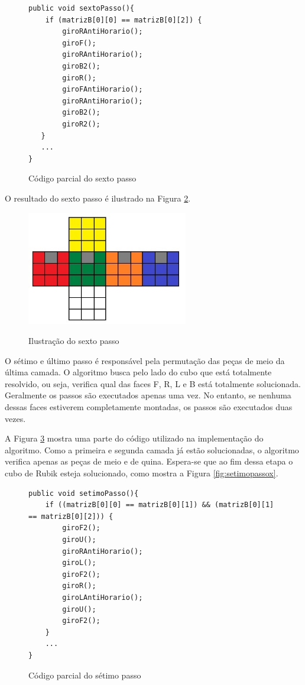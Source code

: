 \begin{figure}[!htb]
\begin{lstlisting}
public void sextoPasso(){
    if (matrizB[0][0] == matrizB[0][2]) {
        giroRAntiHorario();
        giroF();
        giroRAntiHorario();
        giroB2();
        giroR();
        giroFAntiHorario();
        giroRAntiHorario();
        giroB2();
        giroR2();
   }
   ...
}
\end{lstlisting}
\caption{Código parcial do sexto passo}
\label{fig:figfsfsdxx}
\end{figure}


O resultado do sexto passo é ilustrado na Figura \ref{fig:sextopasso}.

\begin{figure}[!htb]
    \centering
    {
        \includegraphics[height=5cm]{imagens/sextopasso.jpg}
        \label{figFront}
    }
    
\caption{Ilustração do sexto passo}
\label{fig:sextopasso}
\end{figure}


O sétimo e último passo é responsável pela permutação das peças de meio da última camada. O algoritmo busca pelo lado do cubo que está totalmente resolvido, ou seja, verifica qual das faces F, R, L e B está totalmente solucionada. Geralmente os passos são executados apenas uma vez. No entanto, se nenhuma dessas faces estiverem completamente montadas, os passos são executados duas vezes. 


A Figura \ref{fig:fiwwwwwww} mostra uma parte do código utilizado na implementação do algoritmo. Como a primeira e segunda camada já estão solucionadas, o algoritmo verifica apenas as peças de meio e de quina. Espera-se que ao fim dessa etapa o cubo de Rubik esteja solucionado, como mostra a Figura \ref{fig:setimopassox}.

\begin{figure}[!htb]
\begin{lstlisting}
public void setimoPasso(){
    if ((matrizB[0][0] == matrizB[0][1]) && (matrizB[0][1] == matrizB[0][2])) {
        giroF2();
        giroU();
        giroRAntiHorario();
        giroL();
        giroF2();
        giroR();
        giroLAntiHorario();
        giroU();
        giroF2();   
    }
    ...
}
\end{lstlisting}
\caption{Código parcial do sétimo passo}
\label{fig:fiwwwwwww}
\end{figure}




